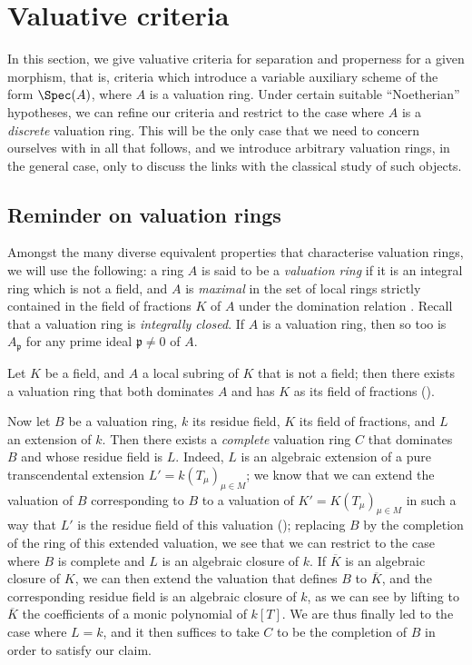 \section{Valuative criteria}
\label{section:II.7}

In this section, we give valuative criteria for separation and properness for a given morphism, that is, criteria which introduce a variable auxiliary scheme of the form $\Spec(A)$, where $A$ is a valuation ring.
Under certain suitable ``Noetherian'' hypotheses, we can refine our criteria and restrict to the case where $A$ is a \emph{discrete} valuation ring.
This will be the only case that we need to concern ourselves with in all that follows, and we introduce arbitrary valuation rings, in the general case, only to discuss the links with the classical study of such objects.


\subsection{Reminder on valuation rings}
\label{subsection:II.7.1}

\begin{env}[7.1.1]
\label{II.7.1.1}
Amongst the many diverse equivalent properties that characterise valuation rings, we will use the following: a ring $A$ is said to be a \emph{valuation ring} if it is an integral ring which is not a field, and $A$ is \emph{maximal} in the set of local rings strictly contained in the field of fractions $K$ of $A$ under the domination relation .
Recall that a valuation ring is \emph{integrally closed}.
If $A$ is a valuation ring, then so too is $A_\mathfrak{p}$ for any prime ideal $\mathfrak{p}\neq0$ of $A$.
\end{env}

\begin{env}[7.1.2]
\label{II.7.1.2}
Let $K$ be a field, and $A$ a local subring of $K$ that is not a field;
then there exists a valuation ring that both dominates $A$ and has $K$ as its field of fractions (\cite[p.~1-07, lemma~2]{I-1}).

Now let $B$ be a valuation ring, $k$ its residue field, $K$ its field of fractions, and $L$ an extension of $k$.
Then there exists a \emph{complete} valuation ring $C$ that dominates $B$ and whose residue field is $L$.
Indeed, $L$ is an algebraic extension of a pure transcendental extension $L'=k(T_\mu)_{\mu\in M}$;
we know that we can extend the valuation of $B$ corresponding to $B$ to a valuation of $K'=K(T_\mu)_{\mu\in M}$ in such a way that $L'$ is the residue field of this valuation (\cite[p.~98]{II-24});
replacing $B$ by the completion of the ring of this extended valuation, we see that we can restrict to the case where $B$ is complete and $L$ is an algebraic closure of $k$.
If $\overline{K}$ is an algebraic closure of $K$, we can then extend the valuation that defines $B$ to $\overline{K}$, and the corresponding residue field is an algebraic closure of $k$, as we can see by lifting to $\overline{K}$ the coefficients of a monic polynomial of $k[T]$.
We are thus finally led to the case where $L=k$, and it then suffices to take $C$ to be the completion of $B$ in order to satisfy our claim.
\end{env}

